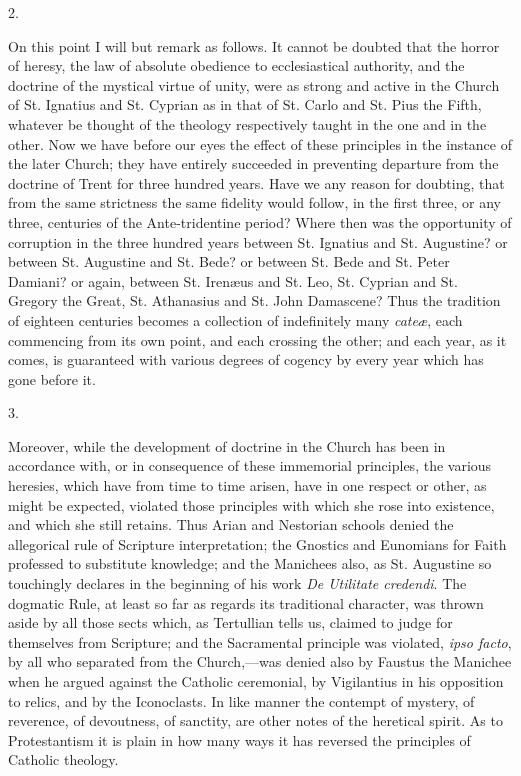 2.

On this point I will but remark as follows. It cannot be doubted
that the horror of heresy, the law of absolute obedience to
ecclesiastical authority, and the doctrine of the mystical virtue of
unity, were as strong and active in the Church of St. Ignatius and St.
Cyprian as in that of St. Carlo and St. Pius the Fifth, whatever be
thought of the theology respectively taught in the one and in the
other. Now we have before our eyes the effect of these principles in
the instance of the later Church; they have entirely succeeded in
preventing departure from the doctrine of Trent for three hundred
years. Have we any reason for doubting, that from the same strictness
the same fidelity would follow, in the first three, or any three,
centuries of the Ante-tridentine period? Where then was the
opportunity of corruption in the three hundred years between St.
Ignatius and St. Augustine? or between St. Augustine and St. Bede? or
between St. Bede and St. Peter Damiani? or again, between St. Irenæus
and St. Leo, St. Cyprian and St. Gregory the Great, St. Athanasius and
St. John Damascene? Thus the tradition of eighteen centuries becomes a
collection of indefinitely many \emph{cateæ}, each commencing from
its own point, and each crossing the other; and each year, as it
comes, is guaranteed with various degrees of cogency by every year
which has gone before it.

3.

Moreover, while the development of doctrine in the Church has been
in accordance with, or in consequence of these immemorial principles,
the various heresies, which have from time to time arisen, have in one
respect or other, as might be expected, violated those principles with
which she rose into existence, and which she still retains. Thus Arian
and Nestorian schools denied the allegorical rule of Scripture
interpretation; the Gnostics and Eunomians for Faith professed to
substitute knowledge; and the Manichees also, as St. Augustine so
touchingly declares in the beginning of his work \emph{De Utilitate
credendi}. The dogmatic Rule, at least so far as regards its
traditional character, was thrown aside by all those sects which, as
Tertullian tells us, claimed to judge for themselves from Scripture;
and the Sacramental principle was violated, \emph{ipso facto}, by all
who separated from the Church,—was denied also by Faustus the
Manichee when he argued against the Catholic ceremonial, by
Vigilantius in his opposition to relics, and by the Iconoclasts. In
like manner the contempt of mystery, of reverence, of devoutness, of
sanctity, are other notes of the heretical spirit. As to Protestantism
it is plain in how many ways it has reversed the principles of
Catholic theology.

